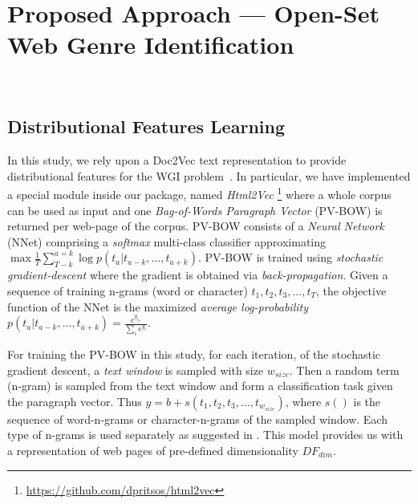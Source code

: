 \documentclass{llncs}
\begin{document}
\section{Proposed Approach --- Open-Set Web Genre Identification}~\label{sec:approach}

\subsection{Distributional Features Learning}\label{sec:Gensim}

In this study, we rely upon a Doc2Vec text representation to provide distributional features for the WGI problem~\cite{rehurek_lrec,mikolov2013efficient,mikolov2013distributed}. In particular, we have implemented a special module inside our package, named \textit{Html2Vec} \footnote{\url{https://github.com/dpritsos/html2vec}} 
where a whole corpus can be used as input and one \textit{Bag-of-Words Paragraph Vector} (PV-BOW) is returned per web-page of the corpus. PV-BOW consists of a \textit{Neural Network} (NNet) comprising a \textit{softmax} multi-class classifier approximating $ \max{\frac{1}{T} \sum^{a=k}_{T-k}{\log{p(t_{a}|t_{a-k},...,t_{a+k})}}}$. PV-BOW is trained using \textit{stochastic gradient-descent} where the gradient is obtained via  \textit{back-propagation}. Given a sequence of training n-grams (word or character) $t_{1}, t_{2}, t_{3}, ..., t_{T}$, the objective function of the NNet is the maximized \textit{average log-probability} $p(t_{a}|t_{a-k},...,t_{a+k}) = \frac{e^{y_{t_{a}}}}{\sum_{i}{e^{y_i}}}$.

For training the PV-BOW in this study, for each iteration, of the stochastic gradient descent, a \textit{text window} is sampled with size $w_{size}$. Then a random term (n-gram) is sampled from the text window and form a classification task given the paragraph vector. Thus $y = b + s(t_{1},t_{2},t_{3},...,t_{w_{size}})$, where $s()$ is the sequence of word-n-grams or character-n-grams of the sampled window. Each type of n-grams is used separately as suggested in \cite{posadas2017application}. This model provides us with a representation of web pages of pre-defined dimensionality $DF_{dim}$.

\end{document}
